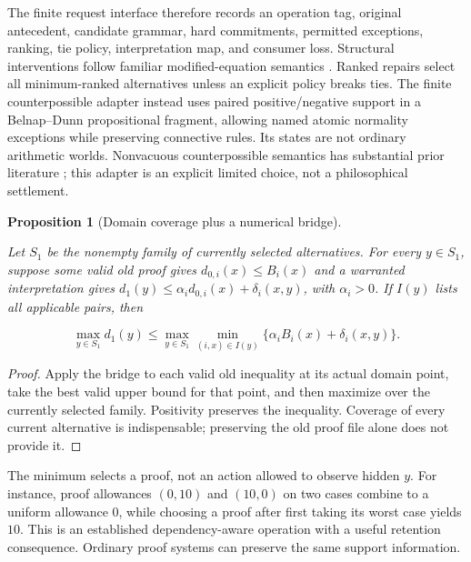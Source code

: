 \documentclass{article}
\newtheorem{proposition}[theorem]{Proposition}
\theoremstyle{definition}
\begin{document}
The finite request interface therefore records an operation tag,
original antecedent, candidate grammar, hard commitments, permitted
exceptions, ranking, tie policy, interpretation map, and consumer loss.
Structural interventions follow familiar modified-equation semantics
\citep{halpern}. Ranked repairs select all minimum-ranked alternatives
unless an explicit policy breaks ties. The finite counterpossible
adapter instead uses paired positive/negative support in a Belnap--Dunn
propositional fragment, allowing named atomic normality exceptions while
preserving connective rules. Its states are not ordinary arithmetic
worlds. Nonvacuous counterpossible semantics has substantial prior
literature \citep{counterpossible}; this adapter is an explicit limited
choice, not a philosophical settlement.

\begin{proposition}[Domain coverage plus a numerical bridge]\label{prop-transport}

Let \(S_1\) be the nonempty family of currently selected alternatives.
For every \(y\in S_1\), suppose some valid old proof gives
\(d_{0,i}(x)\leq B_i(x)\) and a warranted interpretation gives
\(d_1(y)\leq\alpha_i d_{0,i}(x)+\delta_i(x,y)\), with \(\alpha_i>0\). If
\(I(y)\) lists all applicable pairs, then

\begin{equation}
\max_{y\in S_1}d_1(y)
 \leq\max_{y\in S_1}\min_{(i,x)\in I(y)}
       \{\alpha_iB_i(x)+\delta_i(x,y)\}.
 \label{eq-transport}
\end{equation}

\end{proposition}

\begin{proof}

Apply the bridge to each valid old inequality at its actual domain
point, take the best valid upper bound for that point, and then maximize
over the currently selected family. Positivity preserves the inequality.
Coverage of every current alternative is indispensable; preserving the
old proof file alone does not provide it.
\end{proof}

The minimum selects a proof, not an action allowed to observe hidden
\(y\). For instance, proof allowances \((0,10)\) and \((10,0)\) on two
cases combine to a uniform allowance \(0\), while choosing a proof after
first taking its worst case yields \(10\). This is an established
dependency-aware operation with a useful retention consequence. Ordinary
proof systems can preserve the same support information.
\end{document}
